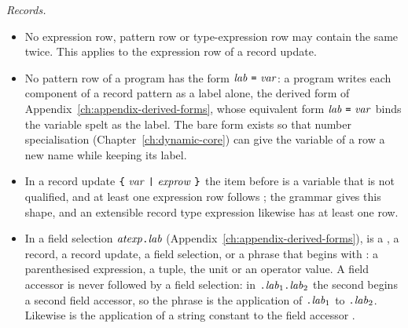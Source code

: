 \emph{Records.}
\begin{itemize}
\item{} No expression row, pattern row or type-expression row may contain the
  same \lab{} twice. This applies to the expression row of a record update.
\item{} No pattern row of a program has the form
  $\lab\ \kw{=}\ \var$: a program writes each component of a record pattern as
  a label alone, the derived form of
  Appendix~\ref{ch:appendix-derived-forms}, whose equivalent form
  $\lab\ \kw{=}\ \var$ binds the variable spelt as the label. The bare form
  exists so that number specialisation (Chapter~\ref{ch:dynamic-core}) can
  give the variable of a row a new name while keeping its label.
\item{} In a record update $\kw{\kwlb}\ \var\ \kw{|}\ \exprow\ \kw{\kwrb}$ the
  item before \kw{|} is a variable that is not qualified, and at least one
  expression row follows \kw{|}; the grammar gives this shape, and an
  extensible record type expression likewise has at least one row.
\item{} In a field selection $\mathit{atexp}\textnormal{\texttt{.}}\mathit{lab}$
  (Appendix~\ref{ch:appendix-derived-forms}), \atexp{} is a \longvar, a
  record, a record update, a field selection, or a phrase that begins with
  \kw{(}: a parenthesised expression, a tuple, the unit or an operator value.
  A field accessor is never followed by a field selection: in
  $\textnormal{\texttt{.}}\mathit{lab}_1\textnormal{\texttt{.}}\mathit{lab}_2$ the second  begins a second field accessor,
  so the phrase is the application of $\textnormal{\texttt{.}}\mathit{lab}_1$ to $\textnormal{\texttt{.}}\mathit{lab}_2$.
  Likewise  is the application of a string constant to the field
  accessor .
\end{itemize}

